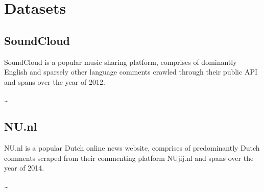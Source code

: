 \chapter{Datasets}

\section{SoundCloud}
SoundCloud is a popular music sharing platform, comprises of dominantly English and sparsely other language comments crawled through their public API and spans over the year of 2012.

\ldots

\section{NU.nl}
NU.nl is a popular Dutch online news website, comprises of predominantly Dutch comments scraped from their commenting platform NUjij.nl and spans over the year of 2014.

\ldots
